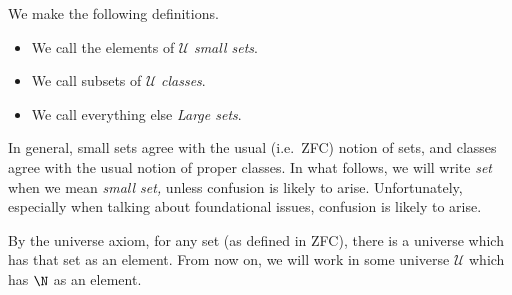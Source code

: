 \documentclass[main.tex]{subfiles}
\begin{document}
\begin{definition}
  \label{def:small_set_class_large_set}
  We make the following definitions.
  \begin{itemize}
    \item We call the elements of $\mathcal{U}$ \emph{small sets}.
    \item We call subsets of $\mathcal{U}$ \emph{classes}.
    \item We call everything else \emph{Large sets}.
  \end{itemize}

  In general, small sets agree with the usual (i.e.\ ZFC) notion of sets, and classes agree with the usual notion of proper classes. In what follows, we will write \emph{set} when we mean \emph{small set,} unless confusion is likely to arise. Unfortunately, especially when talking about foundational issues, confusion is likely to arise.
\end{definition}

By the universe axiom, for any set (as defined in ZFC), there is a universe which has that set as an element. From now on, we will work in some universe $\mathcal{U}$ which has $\N$ as an element.
\end{document}
